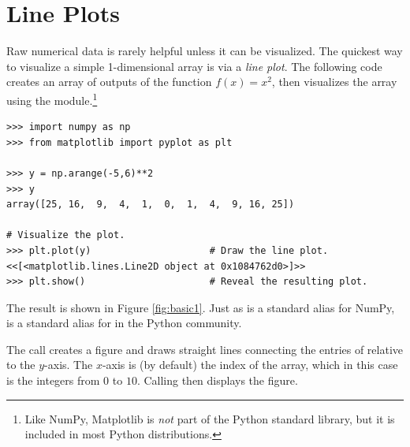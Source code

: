 \label{lab:Matplotlib}

\section*{Line Plots} %

Raw numerical data is rarely helpful unless it can be visualized.
The quickest way to visualize a simple 1-dimensional array is via a \emph{line plot}.
The following code creates an array of outputs of the function $f(x) = x^2$, then visualizes the array using the  module.\footnote{Like NumPy, Matplotlib is \emph{not} part of the Python standard library, but it is included in most Python distributions.}

\begin{lstlisting}
>>> import numpy as np
>>> from matplotlib import pyplot as plt

>>> y = np.arange(-5,6)**2
>>> y
array([25, 16,  9,  4,  1,  0,  1,  4,  9, 16, 25])

# Visualize the plot.
>>> plt.plot(y)                     # Draw the line plot.
<<[<matplotlib.lines.Line2D object at 0x1084762d0>]>>
>>> plt.show()                      # Reveal the resulting plot.
\end{lstlisting}

The result is shown in Figure \ref{fig:basic1}.
Just as  is a standard alias for NumPy,  is a standard alias for  in the Python community.

The call  creates a figure and draws straight lines connecting the entries of  relative to the $y$-axis.
The $x$-axis is (by default) the index of the array, which in this case is the integers from $0$ to $10$.
Calling  then displays the figure.

